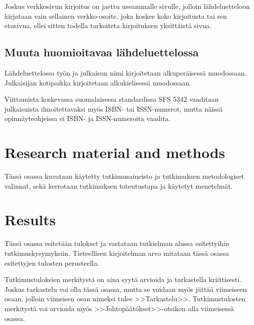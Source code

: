 \documentclass[english,12pt,a4paper,pdftex,elec,utf8]{aaltothesis}
\begin{document}
Joskus verkkosivun kirjoitus on jaettu useammalle sivulle, jolloin
l\"ahdeluetteloon kirjataan vain sellainen verkko-osoite, joka koskee
koko kirjoitusta tai sen etusivua, ellei sitten 
todella tarkoiteta kirjoituksen yksitt\"aist\"a sivua. 

\subsection*{Muuta huomioitavaa l\"ahdeluettelossa}

L\"ahdeluettelossa ty\"on ja julkaisun nimi kirjoitetaan alkuper\"aisess\"a
muodossaan. Julkaisijan kotipaikka kirjoitetaan alkukielisess\"a
muodossaan.

Viittamista koskevassa suomalaisessa standardissa
SFS 5342 \cite{sfs} vaaditaan julkaisuista ilmoitettavaksi my\"os ISBN- tai
ISSN-numerot, mutta n\"aiss\"a opinn\"ayteohjeissa ei ISBN- ja 
ISSN-numeroita vaadita. 

\clearpage

\section{Research material and methods}

T\"ass\"a osassa kuvataan k\"aytetty tutkimusaineisto ja
tutkimuksen metodologiset valinnat, sek\"a
kerrotaan tutkimuksen toteutustapa ja k\"aytetyt menetelm\"at. 

\clearpage

\section{Results}

T\"ass\"a osassa esitet\"a\"an tulokset ja vastataan tutkielman alussa
esitettyihin tutkimuskysymyksiin. Tieteellisen kirjoitelman
arvo mitataan t\"ass\"a osassa esitettyjen tulosten perusteella. 

Tutkimustuloksien merkityst\"a on aina syyt\"a arvioida ja tarkastella
kriittisesti.  Joskus tarkastelu voi olla t\"ass\"a osassa, mutta se
voidaan my\"os j\"att\"a\"a viimeiseen osaan, jolloin viimeisen osan nimeksi
tulee >>Tarkastelu>>. Tutkimustulosten merkityst\"a voi arvioida my\"os
>>Johtop\"a\"at\"okset>>-otsikon alla viimeisess\"a osassa. 
\end{document}

